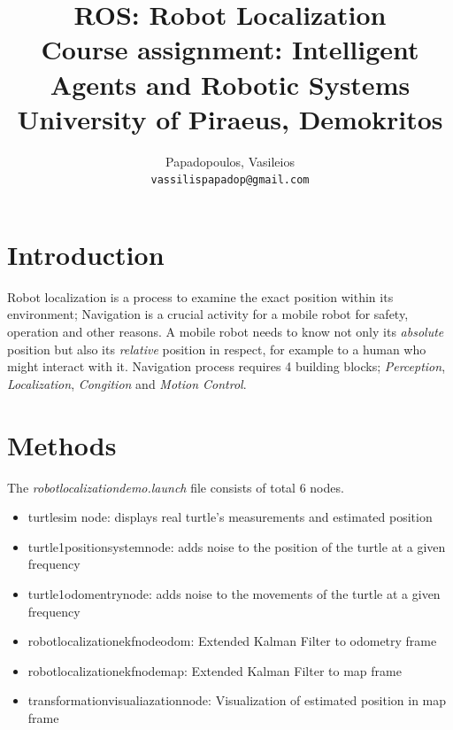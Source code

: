 \documentclass[10pt,a4paper,twocolumn]{article}
\title{%
	ROS: Robot Localization \\
	\large Course assignment: Intelligent Agents and Robotic Systems \\
	University of Piraeus, Demokritos}
\author{
	Papadopoulos, Vasileios\\
	\texttt{vassilispapadop@gmail.com}
}
\begin{document}
\maketitle
	
\section{Introduction}
Robot localization is a process to examine the exact position within its environment; Navigation is a crucial activity for a mobile robot for safety, operation and other reasons. A mobile robot needs to know not only its \textit{absolute} position but also its \textit{relative} position in respect, for example to a human who might interact with it. Navigation process requires 4 building blocks; \textit{Perception}, \textit{Localization}, \textit{Congition} and \textit{Motion Control}.


\section{Methods}

The \textit{robot\textunderscore localization\textunderscore demo.launch} file consists of total 6 nodes.

\begin{itemize}
	\item turtlesim node: displays real turtle's measurements and estimated position
	\item turtle1\textunderscore position\textunderscore system\textunderscore node: adds noise to the position of the turtle at a given frequency
	\item turtle1\textunderscore odomentry\textunderscore node: adds noise to the movements of the turtle at a given frequency
	\item robot\textunderscore localization\textunderscore ekf\textunderscore node\textunderscore odom: Extended Kalman Filter to odometry frame
	\item robot\textunderscore localization\textunderscore ekf\textunderscore node\textunderscore map: Extended Kalman Filter to map frame
	\item transformation\textunderscore visualiazation\textunderscore node: Visualization of estimated position in map frame
\end{itemize}
\end{document}
